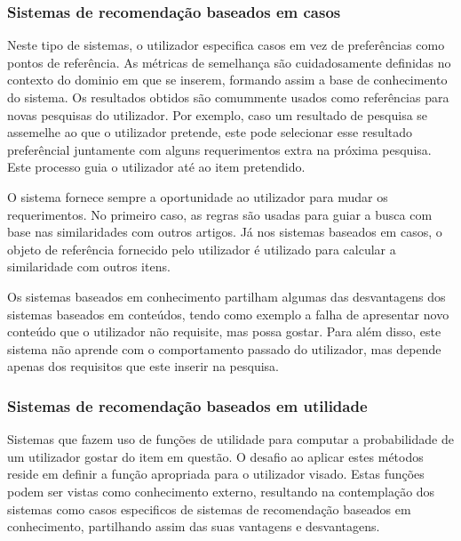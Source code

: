 \subsubsection{Sistemas de recomendação baseados em casos}
\par\hfill
\par Neste tipo de sistemas, o utilizador especifica casos em vez de preferências como pontos de referência. As métricas de semelhança são cuidadosamente definidas no contexto do dominio em que se inserem, formando assim a base de conhecimento do sistema. Os resultados obtidos são comummente usados como referências para novas pesquisas do utilizador. Por exemplo, caso um resultado de pesquisa se assemelhe ao que o utilizador pretende, este pode selecionar esse resultado preferêncial juntamente com alguns requerimentos extra na próxima pesquisa. Este processo guia o utilizador até ao item pretendido.
\par O sistema fornece sempre a oportunidade ao utilizador para mudar os requerimentos. No primeiro caso, as regras são usadas para guiar a busca com base nas similaridades com outros artigos. Já nos sistemas baseados em casos, o objeto de referência fornecido pelo utilizador é utilizado para calcular a similaridade com outros itens.
\par Os sistemas baseados em conhecimento partilham algumas das desvantagens
dos sistemas baseados em conteúdos, tendo como exemplo a falha de apresentar novo conteúdo que o utilizador não requisite, mas possa gostar. Para além disso, este sistema não aprende com o comportamento passado do utilizador, mas depende apenas dos requisitos que este inserir na pesquisa.



\subsubsection{Sistemas de recomendação baseados em utilidade}
\par\hfill
\par Sistemas que fazem uso de funções de utilidade para computar a probabilidade de um utilizador gostar do item em questão.
O desafio ao aplicar estes métodos reside em definir a função apropriada para o utilizador visado. Estas funções podem ser vistas como conhecimento externo, resultando na contemplação dos sistemas como casos especificos de sistemas de recomendação baseados em conhecimento, partilhando assim das suas vantagens e desvantagens.
\hfill

